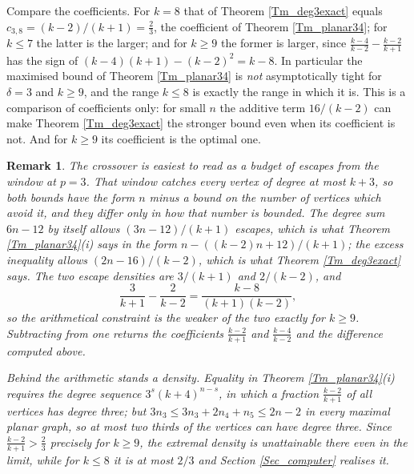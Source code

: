 \documentclass[10pt,a4paper]{article}
\newtheorem{remark}[theorem]{Remark}
\begin{document}


Compare the coefficients. For $k=8$ that of Theorem \ref{Tm_deg3exact} equals $c_{3,8}=(k-2)/(k+1)=\frac23$, the
coefficient of Theorem \ref{Tm_planar34}; for $k\leq 7$ the latter is the larger; and for $k\geq 9$ the former is
larger, since $\frac{k-4}{k-2}-\frac{k-2}{k+1}$ has the sign of $(k-4)(k+1)-(k-2)^{2}=k-8$. In particular the
maximised bound of Theorem \ref{Tm_planar34} is \emph{not} asymptotically tight for $\delta =3$ and $k\geq 9$,
and the range $k\leq 8$ is exactly the range in which it is. This is a comparison of coefficients only: for
small $n$ the additive term $16/(k-2)$ can make Theorem \ref{Tm_deg3exact} the stronger bound even when its
coefficient is not. And for $k\geq 9$ its coefficient is the optimal one.

\begin{remark}
\label{Rem_crossover}
The crossover is easiest to read as a budget of escapes from the window at $p=3$. That window
catches every vertex of degree at most $k+3$, so both bounds have the form $n$ minus a bound on the
number of vertices which avoid it, and they differ only in how that number is bounded. The degree
sum $6n-12$ by itself allows $(3n-12)/(k+1)$ escapes, which is what Theorem \ref{Tm_planar34}(i)
says in the form $n-((k-2)n+12)/(k+1)$; the excess inequality allows $(2n-16)/(k-2)$, which is what
Theorem \ref{Tm_deg3exact} says. The two escape densities are $3/(k+1)$ and $2/(k-2)$, and
\[
\frac{3}{k+1}-\frac{2}{k-2}=\frac{k-8}{(k+1)(k-2)},
\]
so the arithmetical constraint is the weaker of the two exactly for $k\geq 9$. Subtracting from one
returns the coefficients $\frac{k-2}{k+1}$ and $\frac{k-4}{k-2}$ and the difference computed above.

Behind the arithmetic stands a density. Equality in Theorem \ref{Tm_planar34}(i) requires the degree
sequence $3^{s}(k+4)^{n-s}$, in which a fraction $\frac{k-2}{k+1}$ of all vertices has degree three;
but $3n_{3}\leq 3n_{3}+2n_{4}+n_{5}\leq 2n-2$ in every maximal planar graph, so at most two thirds of the
vertices can have degree three. Since $\frac{k-2}{k+1}>\frac{2}{3}$ precisely for $k\geq 9$, the
extremal density is unattainable there even in the limit, while for $k\leq 8$ it is at most $2/3$
and Section \ref{Sec_computer} realises it. 
\end{remark}
\end{document}
